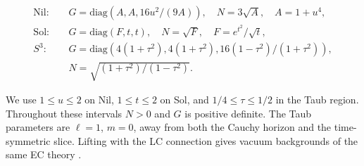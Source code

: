 \begin{equation}\tag{BF-01}\label{eq:BF-01}
\begin{aligned}
\mathrm{Nil}:&\quad G=\mathrm{diag}(A,A,16u^2/(9A)),\quad N=3\sqrt A,\quad A=1+u^4,\\
\mathrm{Sol}:&\quad G=\mathrm{diag}(F,t,t),\quad N=\sqrt F,\quad F=e^{t^2}/\sqrt t,\\
S^3:&\quad G=\mathrm{diag}(4(1+\tau^2),4(1+\tau^2),16(1-\tau^2)/(1+\tau^2)),\\
&\quad N=\sqrt{(1+\tau^2)/(1-\tau^2)}.
\end{aligned}
\end{equation}

We use $1\le u\le2$ on Nil, $1\le t\le2$ on Sol, and $1/4\le\tau\le1/2$ in the Taub region. Throughout these intervals $N>0$ and $G$ is positive definite. The Taub parameters are $\ell=1$, $m=0$, away from both the Cauchy horizon and the time-symmetric slice. Lifting with the LC connection gives vacuum backgrounds of the same EC theory \cite{Tanimoto2004,Rendall2012,BeyerHennig2012}.
